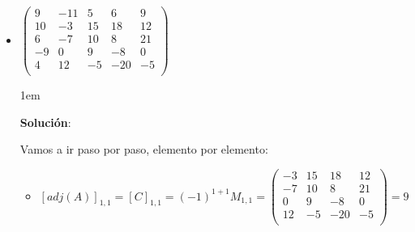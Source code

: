 \documentclass[12pt, fleqn]{article}                             %
\newenvironment{SmallIndentation}[1][0.75em]                    %
        {\begin{adjustwidth}{#1}{}\begin{footnotesize}}             %
        {\end{footnotesize}\end{adjustwidth}}                       %
\theoremstyle{break}                                            %
\newcommand{\pVector}[1]                                        %
        { \ensuremath{\begin{pmatrix}#1\end{pmatrix}} }             %
\begin{document}
\begin{itemize}
\begin{SmallIndentation}[1em]
\begin{itemize}
                \end{itemize}

                Por lo tanto $adj \pVector{
                6 & 7 &9    \\ 
                0 & 10 & 4  \\
                2 & -6 & -4 \\
                } = 
                \pVector{
                -16 & -26 & -62     \\ 
                8 & -42 & -24       \\
                -20 & 50 & 60       \\
                }$
                
            \end{SmallIndentation}

        \clearpage

        \item 
            $\pVector{
                9  & -11 & 5  & 6   & 9    \\ 
                10 & -3  & 15 & 18  & 12   \\ 
                6  & -7  & 10 & 8   & 21   \\ 
                -9 & 0   & 9  & -8  & 0    \\ 
                4  & 12  & -5 & -20 & -5   \\ 
                }$

            \begin{SmallIndentation}[1em]
                \textbf{Solución}:

                Vamos a ir paso por paso, elemento por elemento:
                \begin{itemize}
                    
                    \item
                        $[adj(A)]_{1, 1} 
                            = [C]_{1, 1} 
                            = (-1)^{1+1} M_{1, 1}
                            = \pVector{
                                    -3  & 15 & 18  & 12   \\
                                    -7  & 10 & 8   & 21   \\
                                    0   & 9  & -8  & 0    \\
                                    12  & -5 & -20 & -5   \\
                                }
                            = 9$


\end{itemize}
\end{SmallIndentation}
\end{itemize}
\end{document}
